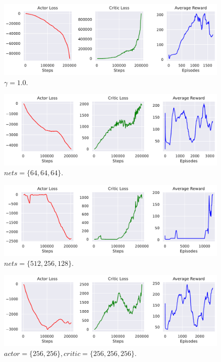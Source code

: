 \begin{figure}[ht]
  \centering
  \includegraphics[width=\linewidth]{images/exp-gamma1.0.pdf}
  \caption{$\gamma=1.0$.}
\end{figure}

\begin{figure}[ht]
  \centering
  \includegraphics[width=\linewidth]{images/exp-hopper-64-64-64.pdf}
  \caption{$nets = \{64, 64, 64\}$.}
\end{figure}

\begin{figure}[ht]
  \centering
  \includegraphics[width=\linewidth]{images/exp-hopper-512-256-128.pdf}
  \caption{$nets = \{512, 256, 128\}$.}
\end{figure}

\begin{figure}[ht]
  \centering
  \includegraphics[width=\linewidth]{images/exp-hopper-Aless.pdf}
  \caption{$actor = \{256, 256\}, critic = \{256, 256, 256\}$.}
\end{figure}

